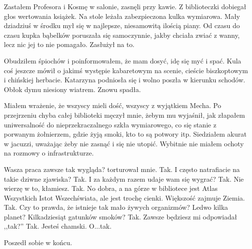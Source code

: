Zastałem Profesora i Kosmę w salonie, zasnęli przy kawie.
Z biblioteczki dobiegał głos wertowania książek.
Na stole leżała zabezpieczona kulka wymiarowa. Mały dziadziuś w środku mył się w najlepsze, niesamowitą ilością piany.
Od czasu do czasu kupka bąbelków poruszała się samoczynnie, jakby chciała zwiać z wanny, lecz nic jej to nie pomagało.
Zasłużył na to.

Obudziłem śpiochów i poinformowałem, że mam dosyć, idę się myć i spać.
Kula coś jeszcze mówił o jakimś występie kabaretowym na scenie, cieście biszkoptowym i chińskiej herbacie. 
Katarzyna podniosła się i wolno poszła w kierunku schodów. Obłok dymu niesiony wiatrem.
Znowu spadła.

Miałem wrażenie, że wszyscy mieli dość, wszyscy z wyjątkiem Mecha.
Po przejrzeniu chyba całej biblioteki męczył mnie, żebym mu wyjaśnił, jak złapałem uniwersalność do nieprzekraczalnego szkła wymiarowego,
co się stanie z porwanym żołnierzem, gdzie żyją smoki, kto to są potwory itp.
Siedziałem akurat w jacuzzi, uważając żeby nie zasnąć i się nie utopić. Wybitnie nie miałem ochoty na rozmowy o infrastrukturze.
\begin{dialogue}
\ds{} Wasza praca zawsze tak wygląda? \dm{} torturował mnie.
\ds{} Tak.
\ds{} I często natrafiacie na takie dziwne zjawiska?
\ds{} Tak.
\ds{} I za każdym razem udaje wam się wygrać?
\ds{} Tak.
\ds{} Nie wierzę w to, kłamiesz.
\ds{} Tak.
\ds{} No dobra, a na górze w bibliotece jest Atlas Wszystkich Istot Wszechświata, ale jest trochę cienki. Większość zajmuje Ziemia.
\ds{} Tak.
\ds{} Czy to prawda, że istnieje tak mało żywych organizmów? Ledwo kilka planet? Kilkadziesiąt gatunków smoków?
\ds{} Tak.
\ds{} Zawsze będziesz mi odpowiadał ,,tak?''
\ds{} Tak.
\ds{} Jesteś chamski.
\ds{} O...tak.
\end{dialogue}
Poszedł sobie w końcu.

